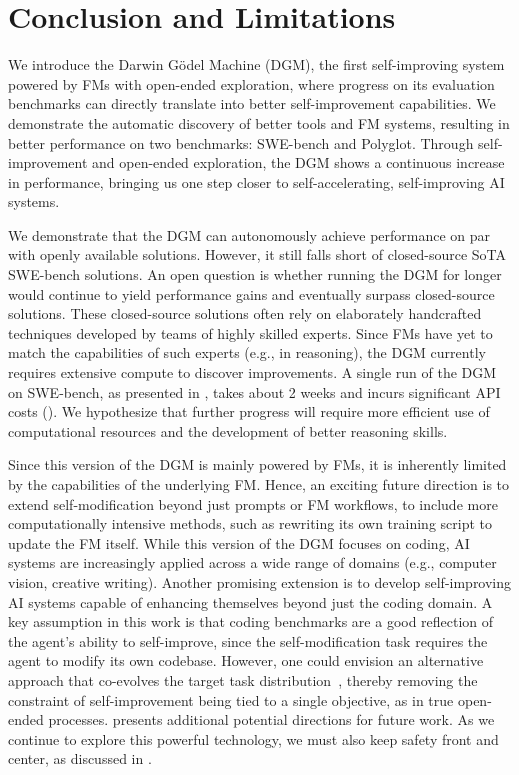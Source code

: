\section{Conclusion and Limitations}
\label{sec:conclusion}

We introduce the Darwin G\"odel Machine (DGM), the first self-improving system powered by FMs with open-ended exploration, where progress on its evaluation benchmarks can directly translate into better self-improvement capabilities. We demonstrate the automatic discovery of better tools and FM systems, resulting in better performance on two benchmarks: SWE-bench and Polyglot. Through self-improvement and open-ended exploration, the DGM shows a continuous increase in performance, bringing us one step closer to self-accelerating, self-improving AI systems.

We demonstrate that the DGM can autonomously achieve performance on par with openly available solutions. However, it still falls short of closed-source SoTA SWE-bench solutions. An open question is whether running the DGM for longer would continue to yield performance gains and eventually surpass closed-source solutions. These closed-source solutions often rely on elaborately handcrafted techniques developed by teams of highly skilled experts. Since FMs have yet to match the capabilities of such experts (e.g., in reasoning), the DGM currently requires extensive compute to discover improvements. A single run of the DGM on SWE-bench, as presented in , takes about 2 weeks and incurs significant API costs (). We hypothesize that further progress will require more efficient use of computational resources and the development of better reasoning skills.

Since this version of the DGM is mainly powered by FMs, it is inherently limited by the capabilities of the underlying FM. Hence, an exciting future direction is to extend self-modification beyond just prompts or FM workflows, to include more computationally intensive methods, such as rewriting its own training script to update the FM itself. While this version of the DGM focuses on coding, AI systems are increasingly applied across a wide range of domains (e.g., computer vision, creative writing). Another promising extension is to develop self-improving AI systems capable of enhancing themselves beyond just the coding domain. A key assumption in this work is that coding benchmarks are a good reflection of the agent's ability to self-improve, since the self-modification task requires the agent to modify its own codebase. However, one could envision an alternative approach that co-evolves the target task distribution~\citep{faldor2025omni, wang2023robogen}, thereby removing the constraint of self-improvement being tied to a single objective, as in true open-ended processes.  presents additional potential directions for future work. As we continue to explore this powerful technology, we must also keep safety front and center, as discussed in .

